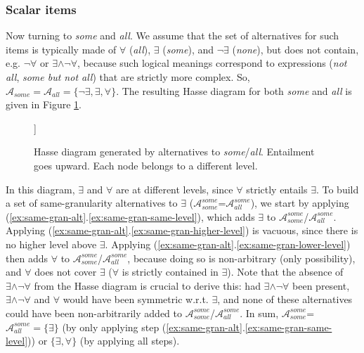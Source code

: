 	
	\subsubsection{Scalar items}
	Now turning to \textit{some} and \textit{all}. We assume that the set of alternatives for such items is typically made of $\forall$ (\textit{all}), $\exists$ (\textit{some}), and $\neg\exists$ (\textit{none}), but does not contain, e.g. $\neg\forall$ or $\exists\wedge\neg\forall$, because such logical meanings correspond to expressions (\textit{not all}, \textit{some but not all}) that are strictly more complex. So, $\mathcal{A}_{\textit{some}}=\mathcal{A}_{\textit{all}}=\lbrace \neg\exists, \exists, \forall\rbrace$. The resulting Hasse diagram for both \textit{some} and \textit{all} is given in Figure \ref{fig:some-all-hasse}.
	
	\begin{figure}[H]
		\centering
		\begin{forest}
			[$\exists$[$\forall$]]
		\end{forest}
		\begin{forest}
			[$\neg\exists$]
		\end{forest}
		\caption{Hasse diagram generated by alternatives to \textit{some}/\textit{all}. Entailment goes upward. Each node belongs to a different level.}
		\label{fig:some-all-hasse}
	\end{figure}
	
	In this diagram, $\exists$ and $\forall$ are at different levels, since $\forall$ strictly entails $\exists$. To build a set of same-granularity alternatives to $\exists$ ($\mathcal{A}_{\textit{some}}^{\textit{some}}$=$\mathcal{A}_{\textit{all}}^{\textit{some}}$), we start by applying (\ref{ex:same-gran-alt}.\ref{ex:same-gran-same-level}), which adds $\exists$ to $\mathcal{A}_{\textit{some}}^{\textit{some}}$/$\mathcal{A}_{\textit{all}}^{\textit{some}}$. Applying (\ref{ex:same-gran-alt}.\ref{ex:same-gran-higher-level}) is vacuous, since there is no higher level above $\exists$. Applying (\ref{ex:same-gran-alt}.\ref{ex:same-gran-lower-level}) then adds $\forall$ to $\mathcal{A}_{\textit{some}}^{\textit{some}}$/$\mathcal{A}_{\textit{all}}^{\textit{some}}$, because doing so is non-arbitrary (only possibility), and $\forall$ does not cover $\exists$ ($\forall$ is strictly contained in $\exists$). Note that the absence of $\exists\wedge\neg\forall$ from the Hasse diagram is crucial to derive this: had $\exists\wedge\neg\forall$ been present, $\exists\wedge\neg\forall$ and $\forall$ would have been symmetric w.r.t. $\exists$, and none of these alternatives could have been non-arbitrarily added to $\mathcal{A}_{\textit{some}}^{\textit{some}}$/$\mathcal{A}_{\textit{all}}^{\textit{some}}$. In sum, $\mathcal{A}_{\textit{some}}^{\textit{some}}$=$\mathcal{A}_{\textit{all}}^{\textit{some}} = \lbrace\exists\rbrace$ (by only applying step (\ref{ex:same-gran-alt}.\ref{ex:same-gran-same-level})) or $\lbrace\exists, \forall\rbrace$ (by applying all steps).\\
	
